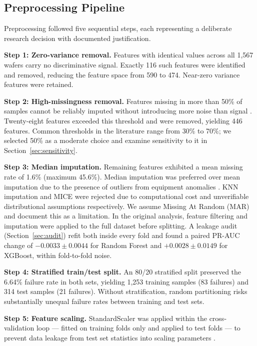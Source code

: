 \documentclass[conference]{IEEEtran}
\begin{document}
\subsection{Preprocessing Pipeline}

Preprocessing followed five sequential steps, each representing a 
deliberate research decision with documented justification.

\textbf{Step 1: Zero-variance removal.} Features with identical 
values across all 1,567 wafers carry no discriminative signal. 
Exactly 116 such features were identified and removed, reducing 
the feature space from 590 to 474. Near-zero variance features 
were retained.

\textbf{Step 2: High-missingness removal.} Features missing in 
more than 50\% of samples cannot be reliably imputed without 
introducing more noise than signal \cite{park2026data}. 
Twenty-eight features exceeded this threshold and were removed, 
yielding 446 features. Common thresholds in the literature range 
from 30\% to 70\%; we selected 50\% as a moderate choice and 
examine sensitivity to it in Section~\ref{sec:sensitivity}.

\textbf{Step 3: Median imputation.} Remaining features exhibited 
a mean missing rate of 1.6\% (maximum 45.6\%). Median imputation 
was preferred over mean imputation due to the presence of outliers 
from equipment anomalies \cite{riaz2025robust}. KNN imputation and 
MICE were rejected due to computational cost and unverifiable 
distributional assumptions respectively. We assume Missing At 
Random (MAR) and document this as a limitation. In the original analysis, feature filtering and imputation were applied to the full dataset before splitting. A leakage audit
(Section~\ref{sec:audit}) refit both inside every fold and found a
paired PR-AUC change of $-0.0033 \pm 0.0044$ for Random Forest and
$+0.0028 \pm 0.0149$ for XGBoost, within fold-to-fold noise.

\textbf{Step 4: Stratified train/test split.} An 80/20 stratified 
split preserved the 6.64\% failure rate in both sets, yielding 
1,253 training samples (83 failures) and 314 test samples (21 
failures). Without stratification, random partitioning risks 
substantially unequal failure rates between training and test sets.

\textbf{Step 5: Feature scaling.} StandardScaler was applied 
within the cross-validation loop --- fitted on training folds 
only and applied to test folds --- to prevent data leakage from 
test set statistics into scaling parameters \cite{pedregosa2011scikit}.
\end{document}
